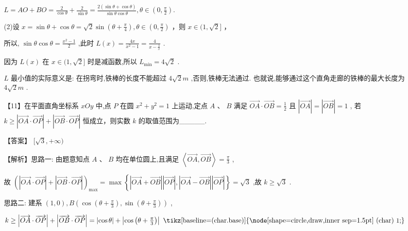 \documentclass[10pt]{article}
\newcommand*\circled[1]{\tikz[baseline=(char.base)]{\node[shape=circle,draw,inner sep=1.5pt] (char) {\small #1};}}
\begin{document}
\(L = {AO} + {BO} = \frac{2}{\cos \theta } + \frac{2}{\sin \theta } = \frac{2\left( {\sin \theta  + \cos \theta }\right) }{\sin \theta \cos \theta },\theta  \in  \left( {0,\frac{\pi }{2}}\right) .\)

(2)设 \(x = \sin \theta  + \cos \theta  = \sqrt{2}\sin \left( {\theta  + \frac{\pi }{4}}\right) ,\theta  \in  \left( {0,\frac{\pi }{2}}\right)\) ，则 \(x \in  (1,\sqrt{2}\rbrack\) ，

所以, \(\sin \theta \cos \theta  = \frac{{x}^{2} - 1}{2}\) ,此时 \(L\left( x\right)  = \frac{4x}{{x}^{2} - 1} = \frac{4}{x - \frac{1}{x}}\) .

因为 \(L\left( x\right)\) 在 \(x \in  (1,\sqrt{2}\rbrack\) 时是减函数,所以 \({L}_{\min } = 4\sqrt{2}\) .

\(L\) 最小值的实际意义是: 在拐弯时,铁棒的长度不能超过 \(4\sqrt{2}m\) ,否则,铁棒无法通过. 也就说,能够通过这个直角走廊的铁棒的最大长度为 \(4\sqrt{2}m\) .

【11】在平面直角坐标系 \({xOy}\) 中,点 \(P\) 在圆 \({x}^{2} + {y}^{2} = 1\) 上运动,定点 \(A\text{ 、 }B\) 满足 \(\overrightarrow{OA} \cdot  \overrightarrow{OB} = \frac{1}{2}\) 且 \(\left| \overrightarrow{OA}\right|  = \left| \overrightarrow{OB}\right|  = 1\) , 若 \(k \geq  \left| {\overrightarrow{OA} \cdot  \overrightarrow{OP}}\right|  + \left| {\overrightarrow{OB} \cdot  \overrightarrow{OP}}\right|\) 恒成立，则实数 \(k\) 的取值范围为\_\_\_\_\_.

【答案】 \(\lbrack \sqrt{3}, + \infty )\)

【解析】思路一: 由题意知点 \(A\text{ 、 }B\) 均在单位圆上,且满足 \(\left\langle  {\overrightarrow{OA},\overrightarrow{OB}}\right\rangle   = \frac{\pi }{3}\) ,

故 \({\left( \left| \overrightarrow{OA} \cdot  \overrightarrow{OP}\right|  + \left| \overrightarrow{OB} \cdot  \overrightarrow{OP}\right| \right) }_{\max } = \max \left\{  {\left| {\overrightarrow{OA} + \overrightarrow{OB}}\right| \left| \overrightarrow{OP}\right| ,\left| {\overrightarrow{OA} - \overrightarrow{OB}}\right| \left| \overrightarrow{OP}\right| }\right\}   = \sqrt{3}\) ,故 \(k \geq  \sqrt{3}\) .

思路二: 建系 \(\left( {1,0}\right) ,B\left( {\cos \left( {\theta  + \frac{\pi }{3}}\right) ,\sin \left( {\theta  + \frac{\pi }{3}}\right) }\right)\) ,

\(k \geq  \left| {\overrightarrow{OA} \cdot  \overrightarrow{OP}}\right|  + \left| {\overrightarrow{OB} \cdot  \overrightarrow{OP}}\right|  = \left| {\cos \theta }\right|  + \left| {\cos \left( {\theta  + \frac{\pi }{3}}\right) }\right| \text{  \circled{1}  }\)
\end{document}
